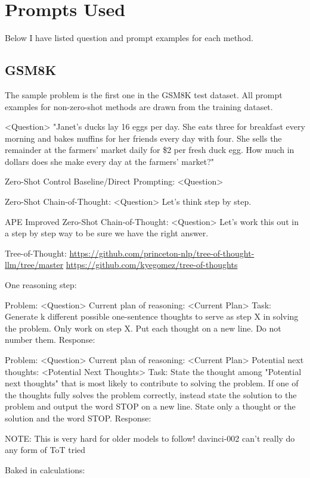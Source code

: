 \documentclass[11pt]{article}
\begin{document}
\section{Prompts Used}

Below I have listed question and prompt examples for each method.
\subsection{GSM8K}

The sample problem is the first one in the GSM8K test dataset. All prompt examples for non-zero-shot methods are drawn from the training dataset.

<Question> "Janet's ducks lay 16 eggs per day. She eats three for breakfast every morning and bakes muffins for her friends every day with four. She sells the remainder at the farmers' market daily for \$2 per fresh duck egg. How much in dollars does she make every day at the farmers' market?"

Zero-Shot Control Baseline/Direct Prompting:
<Question>

Zero-Shot Chain-of-Thought:
<Question>
Let's think step by step.

APE Improved Zero-Shot Chain-of-Thought:
<Question>
Let's work this out in a step by step way to be sure we have the right answer.

Tree-of-Thought: \url{https://github.com/princeton-nlp/tree-of-thought-llm/tree/master} \url{https://github.com/kyegomez/tree-of-thoughts}

One reasoning step:

Problem:
<Question>
Current plan of reasoning:
<Current Plan>
Task:
Generate {k} different possible one-sentence thoughts to serve as step {X} in solving the problem. Only work on step {X}. Put each thought on a new line. Do not number them.
Response:

Problem:
<Question> 
Current plan of reasoning:
<Current Plan>
Potential next thoughts:
<Potential Next Thoughts>
Task:
State the thought among "Potential next thoughts" that is most likely to contribute to solving the problem. If one of the thoughts fully solves the problem correctly, instead state the solution to the problem and output the word STOP on a new line. State only a thought or the solution and the word STOP.
Response:

NOTE: This is very hard for older models to follow! davinci-002 can't really do any form of ToT tried

Baked in calculations:
\end{document}
